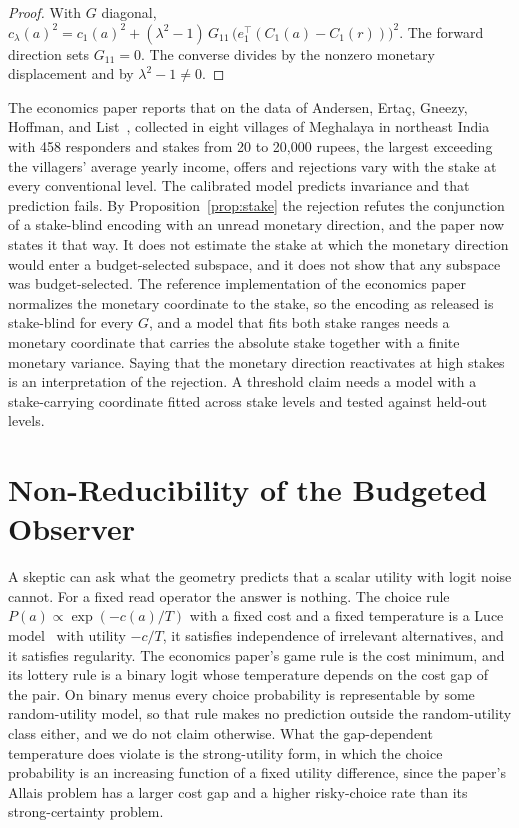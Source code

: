 \documentclass[11pt]{article}
\theoremstyle{definition}
\theoremstyle{remark}
\begin{document}
\begin{proof}
With $G$ diagonal, $c_{\lambda}(a)^{2}=c_{1}(a)^{2}+(\lambda^{2}-1)\,G_{11}\,\bigl(e_{1}^{\top}(C_{1}(a)-C_{1}(r))\bigr)^{2}$.
The forward direction sets $G_{11}=0$.
The converse divides by the nonzero monetary displacement and by $\lambda^{2}-1\ne0$.
\end{proof}

The economics paper reports that on the data of Andersen, Erta\c{c}, Gneezy, Hoffman, and List~\cite{andersen2011}, collected in eight villages of Meghalaya in northeast India with 458 responders and stakes from 20 to 20,000 rupees, the largest exceeding the villagers' average yearly income, offers and rejections vary with the stake at every conventional level.
The calibrated model predicts invariance and that prediction fails.
By Proposition~\ref{prop:stake} the rejection refutes the conjunction of a stake-blind encoding with an unread monetary direction, and the paper now states it that way.
It does not estimate the stake at which the monetary direction would enter a budget-selected subspace, and it does not show that any subspace was budget-selected.
The reference implementation of the economics paper~\cite{bond2026eriseconsw} normalizes the monetary coordinate to the stake, so the encoding as released is stake-blind for every $G$, and a model that fits both stake ranges needs a monetary coordinate that carries the absolute stake together with a finite monetary variance.
Saying that the monetary direction reactivates at high stakes is an interpretation of the rejection.
A threshold claim needs a model with a stake-carrying coordinate fitted across stake levels and tested against held-out levels.

\section{Non-Reducibility of the Budgeted Observer}
\label{sec:nonred}

A skeptic can ask what the geometry predicts that a scalar utility with logit noise cannot.
For a fixed read operator the answer is nothing.
The choice rule $P(a)\propto\exp(-c(a)/T)$ with a fixed cost and a fixed temperature is a Luce model~\cite{luce1959} with utility $-c/T$, it satisfies independence of irrelevant alternatives, and it satisfies regularity.
The economics paper's game rule is the cost minimum, and its lottery rule is a binary logit whose temperature depends on the cost gap of the pair.
On binary menus every choice probability is representable by some random-utility model, so that rule makes no prediction outside the random-utility class either, and we do not claim otherwise.
What the gap-dependent temperature does violate is the strong-utility form, in which the choice probability is an increasing function of a fixed utility difference, since the paper's Allais problem has a larger cost gap and a higher risky-choice rate than its strong-certainty problem.
\end{document}
